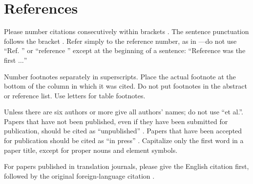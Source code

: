 \documentclass[conference]{IEEEtran}
\begin{document}
\section*{References}

Please number citations consecutively within brackets \cite{b1}. The 
sentence punctuation follows the bracket \cite{b2}. Refer simply to the reference 
number, as in \cite{b3}---do not use ``Ref. \cite{b3}'' or ``reference \cite{b3}'' except at 
the beginning of a sentence: ``Reference \cite{b3} was the first $\ldots$''

Number footnotes separately in superscripts. Place the actual footnote at 
the bottom of the column in which it was cited. Do not put footnotes in the 
abstract or reference list. Use letters for table footnotes.

Unless there are six authors or more give all authors' names; do not use 
``et al.''. Papers that have not been published, even if they have been 
submitted for publication, should be cited as ``unpublished'' \cite{b4}. Papers 
that have been accepted for publication should be cited as ``in press'' \cite{b5}. 
Capitalize only the first word in a paper title, except for proper nouns and 
element symbols.

For papers published in translation journals, please give the English 
citation first, followed by the original foreign-language citation \cite{b6}.
\end{document}
